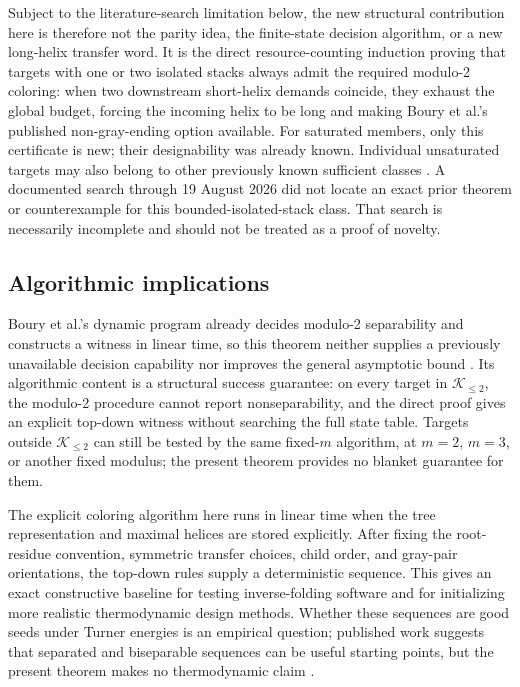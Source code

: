\documentclass[11pt]{article}
\newcommand{\Ktwo}{\mathcal{K}_{\le 2}}
\begin{document}
Subject to the literature-search limitation below, the new structural contribution here is therefore not the parity idea, the finite-state decision algorithm, or a new long-helix transfer word.  It is the direct resource-counting induction proving that targets with one or two isolated stacks always admit the required modulo-2 coloring: when two downstream short-helix demands coincide, they exhaust the global budget, forcing the incoming helix to be long and making Boury et al.'s published non-gray-ending option available.  For saturated members, only this certificate is new; their designability was already known.  Individual unsaturated targets may also belong to other previously known sufficient classes \citep{jedwab2020}.  A documented search through 19 August 2026 did not locate an exact prior theorem or counterexample for this bounded-isolated-stack class.  That search is necessarily incomplete and should not be treated as a proof of novelty.

\subsection{Algorithmic implications}

Boury et al.'s dynamic program already decides modulo-2 separability and constructs a witness in linear time, so this theorem neither supplies a previously unavailable decision capability nor improves the general asymptotic bound \citep{boury2024,boury2025}.  Its algorithmic content is a structural success guarantee: on every target in $\Ktwo$, the modulo-2 procedure cannot report nonseparability, and the direct proof gives an explicit top-down witness without searching the full state table.  Targets outside $\Ktwo$ can still be tested by the same fixed-$m$ algorithm, at $m=2$, $m=3$, or another fixed modulus; the present theorem provides no blanket guarantee for them.

The explicit coloring algorithm here runs in linear time when the tree representation and maximal helices are stored explicitly.  After fixing the root-residue convention, symmetric transfer choices, child order, and gray-pair orientations, the top-down rules supply a deterministic sequence.  This gives an exact constructive baseline for testing inverse-folding software and for initializing more realistic thermodynamic design methods.  Whether these sequences are good seeds under Turner energies is an empirical question; published work suggests that separated and biseparable sequences can be useful starting points, but the present theorem makes no thermodynamic claim \citep{boury2025,boury2025seeding}.
\end{document}
